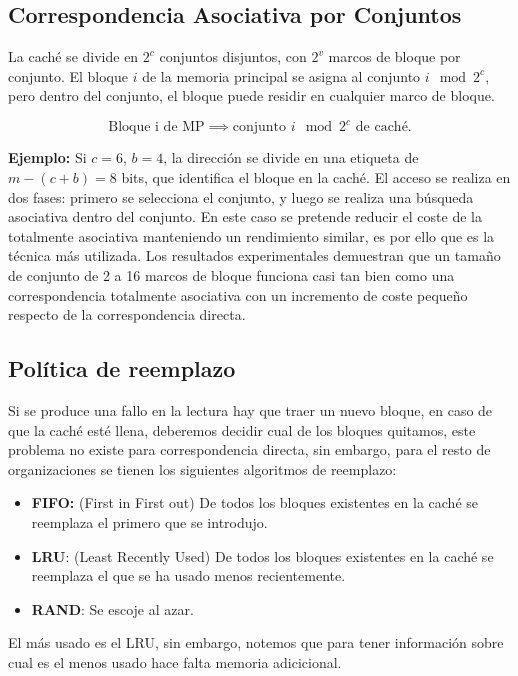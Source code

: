 \subsection{Correspondencia Asociativa por Conjuntos}
La caché se divide en \( 2^c \) conjuntos disjuntos, con \( 2^v \) marcos de bloque por conjunto. El bloque \( i \) de la memoria principal se asigna al conjunto \( i \mod 2^c \), pero dentro del conjunto, el bloque puede residir en cualquier marco de bloque.

\[
\text{Bloque i de MP} \implies \text{conjunto } i \mod 2^c \text{ de caché}.
\]

\textbf{Ejemplo:} Si \( c = 6 \), \( b = 4 \), la dirección se divide en una etiqueta de \( m - (c+b) = 8 \) bits, que identifica el bloque en la caché. El acceso se realiza en dos fases: primero se selecciona el conjunto, y luego se realiza una búsqueda asociativa dentro del conjunto.
En este caso se pretende reducir el coste de la totalmente asociativa manteniendo un rendimiento similar, es por ello que es la técnica más utilizada. Los resultados experimentales demuestran que un tamaño de conjunto de 2 a 16 marcos de bloque funciona casi tan bien como una correspondencia
totalmente asociativa con un incremento de coste pequeño respecto de la correspondencia directa.

\subsection{Política de reemplazo}
Si se produce una fallo en la lectura hay que traer un nuevo bloque, en caso de que la caché esté llena, deberemos decidir
cual de los bloques quitamos, este problema no existe para correspondencia directa, sin embargo, para el resto de organizaciones se tienen
los siguientes algoritmos de reemplazo:
\begin{itemize}
    \item \textbf{FIFO:} (First in First out) De todos los bloques existentes en la caché se reemplaza el primero que se introdujo.
    \item \textbf{LRU}: (Least Recently Used) De todos los bloques existentes en la caché se reemplaza el que se ha usado menos recientemente.
    \item \textbf{RAND}: Se escoje al azar.
\end{itemize}
El más usado es el LRU, sin embargo, notemos que para tener información sobre cual es el menos usado hace falta memoria adicicional.


